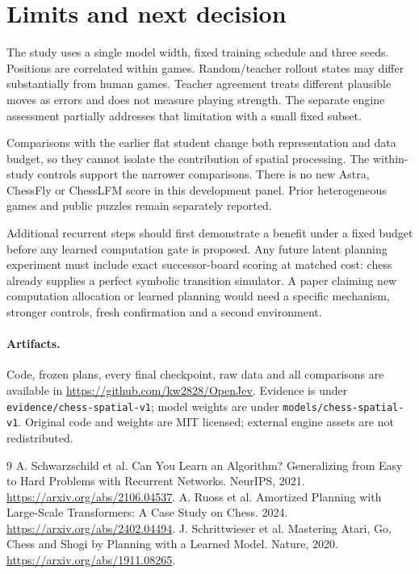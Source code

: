 \documentclass[10pt]{article}
\begin{document}
\section{Limits and next decision}
The study uses a single model width, fixed training schedule and three seeds.
Positions are correlated within games. Random/teacher rollout states may differ
substantially from human games. Teacher agreement treats different plausible
moves as errors and does not measure playing strength. The separate engine
assessment partially addresses that limitation with a small fixed subset.

Comparisons with the earlier flat student change both representation and data
budget, so they cannot isolate the contribution of spatial processing. The
within-study controls support the narrower comparisons. There is no new Astra,
ChessFly or ChessLFM score in this development panel. Prior heterogeneous games
and public puzzles remain separately reported.

Additional recurrent steps should first demonstrate a benefit under a fixed
budget before any learned computation gate is proposed. Any future latent
planning experiment must include exact successor-board scoring at matched cost:
chess already supplies a perfect symbolic transition simulator. A paper claiming
new computation allocation or learned planning would need a specific mechanism,
stronger controls, fresh confirmation and a second environment.

\paragraph{Artifacts.}
Code, frozen plans, every final checkpoint, raw data and all comparisons are
available in \url{https://github.com/kw2828/OpenJev}. Evidence is under
\texttt{evidence/chess-spatial-v1}; model weights are under
\texttt{models/chess-spatial-v1}. Original code and weights are MIT licensed;
external engine assets are not redistributed.

\begin{thebibliography}{9}
 A. Schwarzschild et al. Can You Learn an Algorithm?
Generalizing from Easy to Hard Problems with Recurrent Networks. NeurIPS, 2021.
\url{https://arxiv.org/abs/2106.04537}.
 A. Ruoss et al. Amortized Planning with Large-Scale Transformers:
A Case Study on Chess. 2024. \url{https://arxiv.org/abs/2402.04494}.
 J. Schrittwieser et al. Mastering Atari, Go, Chess and
Shogi by Planning with a Learned Model. Nature, 2020.
\url{https://arxiv.org/abs/1911.08265}.
\end{thebibliography}
\end{document}

